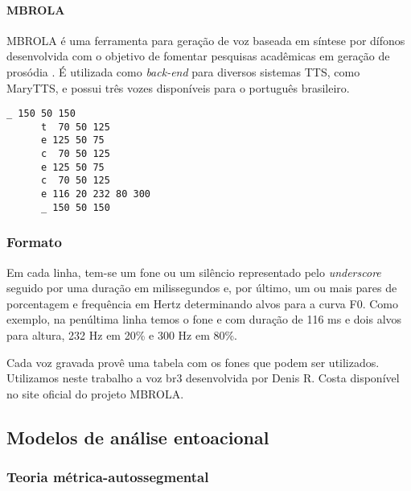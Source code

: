\paragraph{MBROLA}
\label{sec:mbrola}
MBROLA é uma ferramenta para geração de voz baseada em síntese por dífonos
desenvolvida com o objetivo de fomentar pesquisas acadêmicas em geração de
prosódia \cite{mbrola}. É utilizada como \emph{back-end} para diversos sistemas
TTS, como MaryTTS, e possui três vozes disponíveis para o português brasileiro. %

\begin{lstlisting}[caption=Exemplo de arquivo de entrada para MBROLA]
      _ 150 50 150
      t  70 50 125
      e 125 50 75
      c  70 50 125
      e 125 50 75
      c  70 50 125
      e 116 20 232 80 300
      _ 150 50 150
\end{lstlisting}

\subsubsection{Formato}
Em cada linha, tem-se um fone ou um silêncio representado pelo \emph{underscore} seguido por uma duração em milissegundos e, por último, um ou mais pares de porcentagem e frequência em Hertz determinando alvos para a curva F0. Como exemplo, na penúltima linha temos o fone \/e\/ com duração de 116 ms e dois alvos para altura, 232 Hz em 20\% e 300 Hz em 80\%.

Cada voz gravada provê uma tabela com os fones que podem ser utilizados. Utilizamos neste trabalho a voz br3 desenvolvida por Denis R. Costa disponível no site oficial do projeto MBROLA.

\subsection{Modelos de análise entoacional}
\subsubsection{Teoria métrica-autossegmental}

